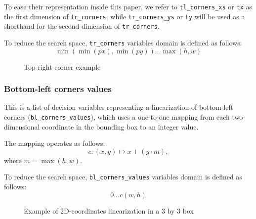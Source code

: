 \documentclass[a4paper,10pt]{article}
\begin{document}
To ease their representation inside this paper, we refer to \texttt{tl\_corners\_xs} or \texttt{tx} as the first dimension of \texttt{tr\_corners}, while \texttt{tr\_corners\_ys} or \texttt{ty} will be used as a shorthand for the second dimension of \texttt{tr\_corners}.

To reduce the search space, \texttt{tr\_corners} variables domain is defined as follows: $$\min({\min({px}), \min({py})}) \dots \max({h, w})$$

\begin{figure}[h]
   \centering
   \caption{Top-right corner example}
\end{figure}

\subsubsection*{Bottom-left corners values} \label{sec:bottom-left-corners-values}
This is a list of decision variables representing a linearization of bottom-left corners (\texttt{bl\_corners\_values}), which uses a one-to-one mapping from each two-dimensional coordinate in the bounding box to an integer value.

The mapping operates as follows:
$$ c: (x,y) \mapsto x+(y\cdot m),$$ where $m = \max{(h,w)}$.

To reduce the search space, \texttt{bl\_corners\_values} variables domain is defined as follows: $$0 \dots c(w, h)$$

\begin{figure}[h]
   \centering
   \caption{Example of 2D-coordinates linearization in a 3 by 3 box}
\end{figure}
\end{document}
